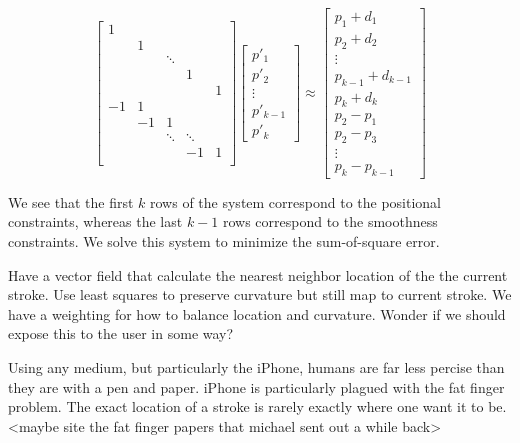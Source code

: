 
\[
\left[
\begin{array}{ccccc}
1 &  &  &  & \\
 & 1 &  &  &  \\
 &  & \ddots &   &  \\
 &  &  & 1 &  \\
  &  &  &  & 1 \\
-1 & 1 &   &  &  \\
 & -1 & 1 &  &  \\
 &  & \ddots & \ddots &  \\
 &  &  & -1 & 1 \\
\end{array}
\right]
\left[
\begin{array}{c}
p'_1 \\
p'_2 \\
\vdots \\
p'_{k-1} \\
p'_k
\end{array}
\right]
 \approx
\left[
\begin{array}{c}
p_1 + d_1\\
p_2 + d_2\\
\vdots \\
p_{k-1} + d_{k-1}\\
p_k + d_k\\
p_2-p_1 \\
p_2-p_3 \\
\vdots \\
p_k - p_{k-1}
\end{array}
\right]
\]

We see that the first $k$ rows of the system correspond to the positional constraints, whereas the last $k-1$ rows correspond to the smoothness constraints.  We solve this system to minimize the sum-of-square error.


Have a vector field that calculate the nearest neighbor location of the the current stroke.
Use least squares to preserve curvature but still map to current stroke.
We have a weighting for how to balance location and curvature. Wonder if we should expose this to the user in some way?


Using any medium, but particularly the iPhone, humans are far less percise than they are with a pen and paper. iPhone is particularly plagued with the fat finger problem. The exact location of a stroke is rarely exactly where one want it to be. <maybe site the fat finger papers that michael sent out a while back> 

